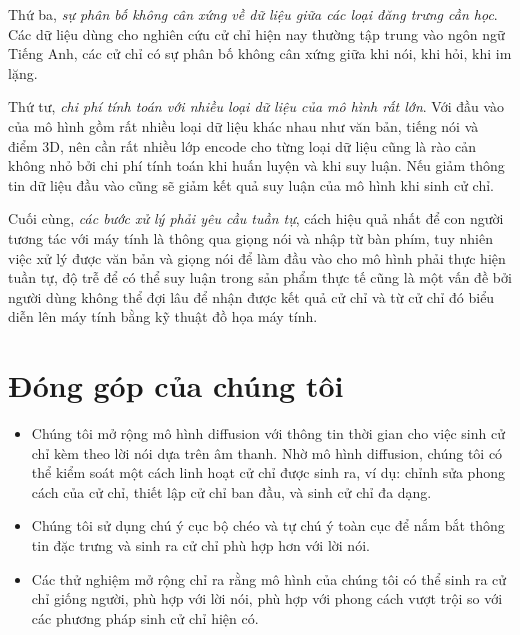 Thứ ba, \textit{sự phân bố không cân xứng về  dữ liệu giữa các loại đăng trưng cần học}. Các dữ liệu dùng cho nghiên cứu cử chỉ hiện nay thường tập trung vào ngôn ngữ Tiếng Anh, các cử chỉ có sự phân bố không cân xứng giữa khi nói, khi hỏi, khi im lặng.

Thứ tư, \textit{chi phí tính toán với nhiều loại dữ liệu của mô hình rất lớn}. Với đầu vào của mô hình gồm rất nhiều loại dữ liệu khác nhau như văn bản, tiếng nói và điểm 3D, nên cần rất nhiều lớp encode cho từng loại dữ liệu cũng là rào cản không nhỏ bởi chi phí tính toán khi huấn luyện và khi suy luận. Nếu giảm thông tin dữ liệu đầu vào cũng sẽ giảm kết quả suy luận của mô hình khi sinh cử chỉ.

Cuối cùng, \textit{các bước xử lý phải yêu cầu tuần tự}, cách hiệu quả nhất để con người tương tác với máy tính là thông qua giọng nói và nhập từ bàn phím, tuy nhiên việc xử lý được văn bản và giọng nói để làm đầu vào cho mô hình phải thực hiện tuần tự, độ trễ để có thể suy luận trong sản phẩm thực tế cũng là một vấn đề bởi người dùng không thể đợi lâu để nhận được kết quả cử chỉ và từ cử chỉ đó biểu diễn lên máy tính bằng kỹ thuật đồ họa máy tính.


\section{Đóng góp của chúng tôi}

\begin{itemize}
\item Chúng tôi mở rộng mô hình diffusion với thông tin thời gian cho việc sinh cử chỉ kèm theo lời nói dựa trên âm thanh. Nhờ mô hình diffusion, chúng tôi có thể kiểm soát một cách linh hoạt cử chỉ được sinh ra, ví dụ: chỉnh sửa phong cách của cử chỉ, thiết lập cử chỉ ban đầu, và sinh cử chỉ đa dạng.

\item Chúng tôi sử dụng chú ý cục bộ chéo và tự chú ý toàn cục để nắm bắt thông tin đặc trưng và sinh ra cử chỉ phù hợp hơn với lời nói.

\item Các thử nghiệm mở rộng chỉ ra rằng mô hình của chúng tôi có thể sinh ra cử chỉ giống người, phù hợp với lời nói, phù hợp với phong cách vượt trội so với các phương pháp sinh cử chỉ hiện có.

\end{itemize}



